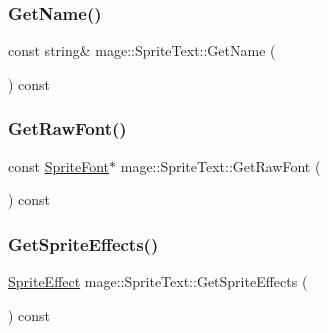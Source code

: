 \subsubsection{\texorpdfstring{Get\+Name()}{GetName()}}
{\footnotesize\ttfamily const string\& mage\+::\+Sprite\+Text\+::\+Get\+Name (\begin{DoxyParamCaption}{ }\end{DoxyParamCaption}) const}

\hypertarget{classmage_1_1_sprite_text_ab67ba17af1b19766343d04f10853c8d6}{}\label{classmage_1_1_sprite_text_ab67ba17af1b19766343d04f10853c8d6} 
\subsubsection{\texorpdfstring{Get\+Raw\+Font()}{GetRawFont()}}
{\footnotesize\ttfamily const \hyperlink{classmage_1_1_sprite_font}{Sprite\+Font}$\ast$ mage\+::\+Sprite\+Text\+::\+Get\+Raw\+Font (\begin{DoxyParamCaption}{ }\end{DoxyParamCaption}) const\hspace{0.3cm}{\ttfamily [protected]}}

\hypertarget{classmage_1_1_sprite_text_a8a97ddf71ed3fd656f0f21b981f8e905}{}\label{classmage_1_1_sprite_text_a8a97ddf71ed3fd656f0f21b981f8e905} 
\subsubsection{\texorpdfstring{Get\+Sprite\+Effects()}{GetSpriteEffects()}}
{\footnotesize\ttfamily \hyperlink{namespacemage_a9cfe18123066ba4236f548f9de75d881}{Sprite\+Effect} mage\+::\+Sprite\+Text\+::\+Get\+Sprite\+Effects (\begin{DoxyParamCaption}{ }\end{DoxyParamCaption}) const}

\hypertarget{classmage_1_1_sprite_text_a48587554bd7f6536aa95cf8dd681ebfb}{}\label{classmage_1_1_sprite_text_a48587554bd7f6536aa95cf8dd681ebfb} 
